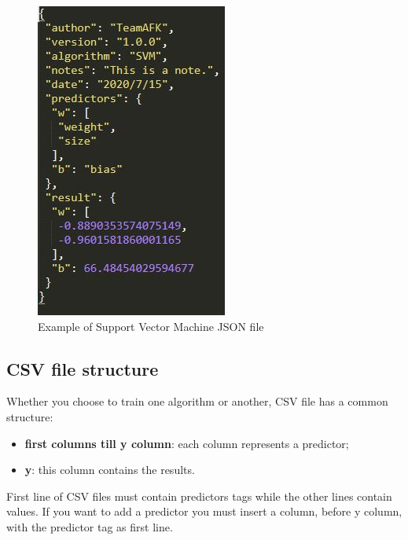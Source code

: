 		\begin{figure}[H]
		\centering
		\includegraphics[scale=0.70]{../Developer_manual/img/support_vector_machine_json.JPG}
		\caption{Example of Support Vector Machine JSON file}
	\end{figure}	
		
	
	\subsection{CSV file structure}
Whether you choose to train one algorithm or another, CSV file has a common structure:
	\begin{itemize}
		\item\textbf{first columns till y column}: each column represents a predictor;
		\item\textbf{y}: this column contains the results.	
	\end{itemize}	 

First line of CSV files must contain predictors tags while the other lines contain values. If you want to add a predictor you must insert a column, before y column, with the predictor tag as first line.

